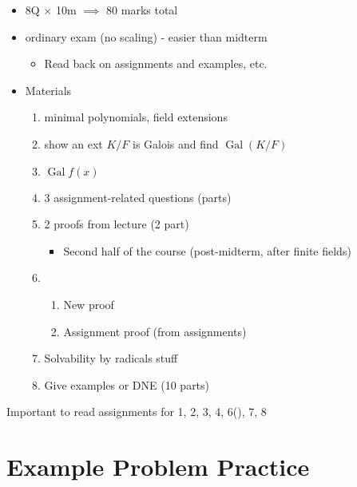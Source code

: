 \documentclass[notoc,notitlepage,nobib]{tufte-book}
\DeclareMathOperator{\Gal}{Gal}
\begin{document}
\begin{itemize}
  \item 8Q $\times$ 10m $\implies$ 80 marks total
  \item ordinary exam (no scaling) - easier than midterm
    \begin{itemize}
      \item Read back on assignments and examples, etc.
    \end{itemize}
  \item Materials
    \begin{enumerate}
      \item minimal polynomials, field extensions
      \item show an ext $K / F$ is Galois and find $\Gal(K / F)$
      \item $\Gal f(x)$
      \item 3 assignment-related questions (parts)
      \item 2 proofs from lecture (2 part)
        \begin{itemize}
          \item Second half of the course (post-midterm, after finite fields)
        \end{itemize}
      \item \begin{enumerate}
          \item New proof
          \item Assignment proof (from assignments)
        \end{enumerate}
      \item Solvability by radicals stuff
      \item Give examples or DNE (10 parts)
    \end{enumerate}
\end{itemize}

Important to read assignments for 1, 2, 3, 4, 6(\faStar), 7, 8


\section{Example Problem Practice}%
\label{sec:example_problem_practice}
\end{document}
